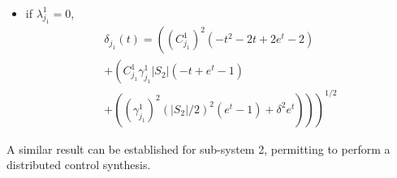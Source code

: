 \begin{theorem}
\begin{itemize}
\begin{multline}
  \end{multline}
\item if $\lambda^1_{j_1} = 0$,
  \begin{multline}
    \delta_{j_1} (t) =
    \left( {(C_{j_1}^1)^2} \left( -  t^2 - 2  t + 2 e^{ t} - 2 \right) \right.   \\
    + \left.  \left( {C_{j_1}^1 \gamma^1_{j_1} |S_2|} \left( -  t + e^{ t} -1 \right) \right. \right.  \\ + \left. \left.  \left({(\gamma^1_{j_1}) ^2 (|S_2 |/2)^2} ( e^{ t } - 1) +  \delta^2 e^{ t}  \right) \right)  \right)^{1/2}
  \end{multline}
\end{itemize}
\end{theorem}

A similar result can be established for sub-system 2, permitting to perform
a distributed control synthesis.

